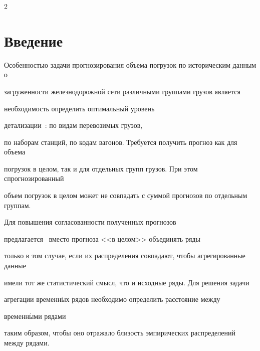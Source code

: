 








      \thispagestyle{headings}



      \begin{multicols}{2}



            \label{st\stat}





\section{Введение}

Особенностью задачи прогнозирования объема погрузок по историческим данным о

загружен\-ности железнодорожной сети различными группами грузов является

необходимость определить оптимальный уровень

детализации~\cite{Medvednikova2012, Motrenko2013}: по видам перевозимых грузов,

по наборам станций, по кодам вагонов. Требуется получить прогноз как для объема

погрузок в целом, так и для отдельных групп грузов. При этом спрогнозированный

объем погрузок в целом может не совпадать с суммой прогнозов по отдельным группам.

Для повышения согласованности полученных прогнозов

предлагается~\cite{Medvdnikova2014} вместо прогноза <<в целом>> объединять ряды

только в том случае, если их распределения совпадают, чтобы агрегированные данные

имели тот же статистический смысл, что и исходные ряды. Для решения задачи

агрегации временн$\acute{\mbox{ы}}$х рядов необходимо определить расстояние между

временн$\acute{\mbox{ы}}$ми рядами

таким образом, чтобы оно отражало близость эмпирических распределений между рядами.




\end{multicols}
